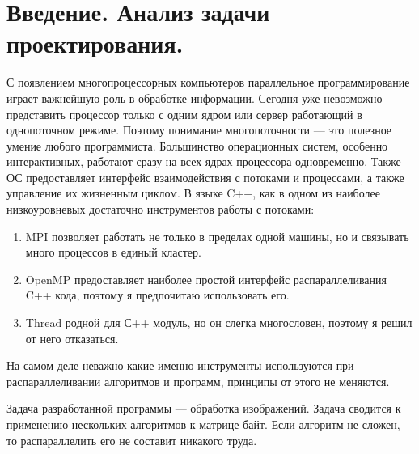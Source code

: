 \section*{Введение. Анализ задачи проектирования.}
С появлением многопроцессорных компьютеров параллельное программирование играет важнейшую роль в обработке информации.
Сегодня уже невозможно представить процессор только с одним ядром или сервер работающий в однопоточном режиме.
Поэтому понимание многопоточности --- это полезное умение любого программиста.
Большинство операционных систем, особенно интерактивных, работают сразу на всех ядрах процессора одновременно.
Также ОС предоставляет интерфейс взаимодействия с потоками и процессами, а также управление их жизненным циклом.
В языке C++, как в одном из наиболее низкоуровневых достаточно инструментов работы с потоками:
\begin{enumerate}
    \item MPI позволяет работать не только в пределах одной машины, но и связывать много процессов в единый кластер.
    \item OpenMP предоставляет наиболее простой интерфейс распараллеливания C++ кода, поэтому я предпочитаю использовать его.
    \item Thread родной для С++ модуль, но он слегка многословен, поэтому я решил от него отказаться.{}
\end{enumerate}
На самом деле неважно какие именно инструменты используются при распараллеливании алгоритмов и программ, принципы от этого не меняются.

Задача разработанной программы --- обработка изображений.
Задача сводится к применению нескольких алгоритмов к матрице байт.
Если алгоритм не сложен, то распараллелить его не составит никакого труда.
